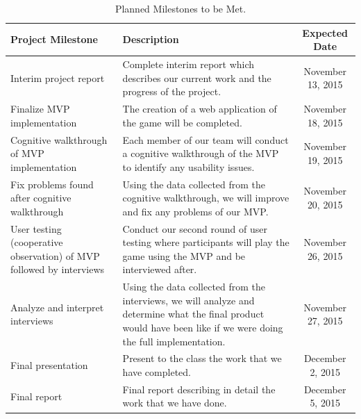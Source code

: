\documentclass{sigchi}
\begin{document}
\label{apx:todo}

\begin{table}[h!]
\centering
\begin{tabular}{>{\raggedright}p{4cm}|>{\raggedright}p{6cm}|c}

\textbf{Project Milestone} & 
\textbf{Description} &
\textbf{Expected Date} \\ \hline \hline

Interim project report &
Complete interim report which describes our current work and the progress of the project. &
November 13, 2015 \\ \hline

Finalize MVP implementation &
The creation of a web application of the game will be completed. &
November 18, 2015 \\ \hline

Cognitive walkthrough of MVP implementation &
Each member of our team will conduct a cognitive walkthrough of the MVP to identify any usability issues. &
November 19, 2015 \\ \hline

Fix problems found after cognitive walkthrough &
Using the data collected from the cognitive walkthrough, we will improve and fix any problems of our MVP. &
November 20, 2015 \\ \hline

User testing (cooperative observation) of MVP followed by interviews &
Conduct our second round of user testing where participants will play the game using the MVP and be interviewed after. &
November 26, 2015 \\ \hline

Analyze and interpret interviews &
Using the data collected from the interviews, we will analyze and determine what the final product would have been like if we were doing the full implementation. &
November 27, 2015 \\ \hline

Final presentation &
Present to the class the work that we have completed. &
December 2, 2015 \\ \hline

Final report &
Final report describing in detail the work that we have done. &
December 5, 2015 \\ \hline

\end{tabular}
\caption{Planned Milestones to be Met.}
\label{tab:todo}
\end{table}
\end{document}
